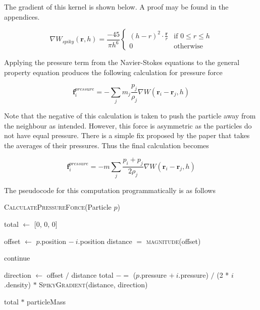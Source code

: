\documentclass[a4paper, 12pt]{article}
\begin{document}
    The gradient of this kernel is shown below\cite{spikygrad}. A proof may be found in the appendices.

    \begin{equation}
        \nabla W_{spiky}(\textbf{r}, h) = \frac{-45}{\pi{h}^6}
        \begin{cases}
            (h-r)^2 \cdot \frac{\textbf{r}}{r} & \text{if } 0 \leq r \leq h \\
            0 & \text{otherwise}
        \end{cases}
    \end{equation}

    Applying the pressure term from the Navier-Stokes equations to the general property equation produces the following calculation for pressure force

    \begin{equation}
        \textbf{f}^{pressure}_i = -\sum_{j}{m_j}\frac{p_j}{\rho_j}\nabla{W(\textbf{r}_i - \textbf{r}_j, h)}
    \end{equation}

    Note that the negative of this calculation is taken to push the particle away from the neighbour as intended. However, this force is asymmetric as the particles do not have equal pressure. There is a simple fix proposed by the paper that takes the averages of their pressures. Thus the final calculation becomes

    \begin{equation}
        \textbf{f}^{pressure}_i = -m\sum_{j}\frac{p_i + p_j}{2\rho_j}\nabla{W(\textbf{r}_i - \textbf{r}_j, h)}
    \end{equation}

    The pseudocode for this computation programmatically is as follows

    \begin{algorithm}[H]
        \caption{\textsc{CalculatePressureForce}(Particle $p$)}
    
        \begin{algorithmic}[1]
            \State total $\gets$ [0, 0, 0]
            
                \State offset $\gets$ $p$.position $-\ i$.position
                \State distance $=$ \textsc{magnitude}(offset)

                    continue
                \EndIf

                \State direction $\gets$ offset $/$ distance
                \State total $-=$ ($p$.pressure $+\ i$.pressure) $/$ (2 * $i$.density) $*$ \textsc{SpikyGradient}(distance, direction)
            \EndFor

            \Return total $*$ particleMass
        \end{algorithmic}

    \end{algorithm}
\end{document}

